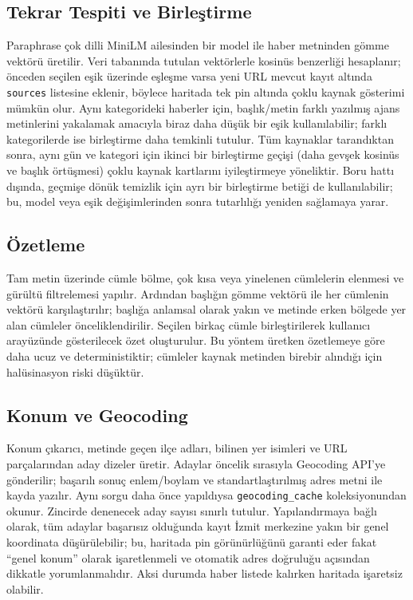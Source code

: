 \documentclass[conference,a4paper]{IEEEtran}
\begin{document}
\subsection{Tekrar Tespiti ve Birleştirme}
Paraphrase çok dilli MiniLM ailesinden bir model ile haber metninden gömme vektörü üretilir. Veri tabanında tutulan vektörlerle kosinüs benzerliği hesaplanır; önceden seçilen eşik üzerinde eşleşme varsa yeni URL mevcut kayıt altında \texttt{sources} listesine eklenir, böylece haritada tek pin altında çoklu kaynak gösterimi mümkün olur. Aynı kategorideki haberler için, başlık/metin farklı yazılmış ajans metinlerini yakalamak amacıyla biraz daha düşük bir eşik kullanılabilir; farklı kategorilerde ise birleştirme daha temkinli tutulur. Tüm kaynaklar tarandıktan sonra, aynı gün ve kategori için ikinci bir birleştirme geçişi (daha gevşek kosinüs ve başlık örtüşmesi) çoklu kaynak kartlarını iyileştirmeye yöneliktir. Boru hattı dışında, geçmişe dönük temizlik için ayrı bir birleştirme betiği de kullanılabilir; bu, model veya eşik değişimlerinden sonra tutarlılığı yeniden sağlamaya yarar.

\subsection{Özetleme}
Tam metin üzerinde cümle bölme, çok kısa veya yinelenen cümlelerin elenmesi ve gürültü filtrelemesi yapılır. Ardından başlığın gömme vektörü ile her cümlenin vektörü karşılaştırılır; başlığa anlamsal olarak yakın ve metinde erken bölgede yer alan cümleler önceliklendirilir. Seçilen birkaç cümle birleştirilerek kullanıcı arayüzünde gösterilecek özet oluşturulur. Bu yöntem üretken özetlemeye göre daha ucuz ve deterministiktir; cümleler kaynak metinden birebir alındığı için halüsinasyon riski düşüktür.

\subsection{Konum ve Geocoding}
Konum çıkarıcı, metinde geçen ilçe adları, bilinen yer isimleri ve URL parçalarından aday dizeler üretir. Adaylar öncelik sırasıyla Geocoding API'ye gönderilir; başarılı sonuç enlem/boylam ve standartlaştırılmış adres metni ile kayda yazılır. Aynı sorgu daha önce yapıldıysa \texttt{geocoding\_cache} koleksiyonundan okunur. Zincirde denenecek aday sayısı sınırlı tutulur. Yapılandırmaya bağlı olarak, tüm adaylar başarısız olduğunda kayıt İzmit merkezine yakın bir genel koordinata düşürülebilir; bu, haritada pin görünürlüğünü garanti eder fakat ``genel konum'' olarak işaretlenmeli ve otomatik adres doğruluğu açısından dikkatle yorumlanmalıdır. Aksi durumda haber listede kalırken haritada işaretsiz olabilir.
\end{document}
